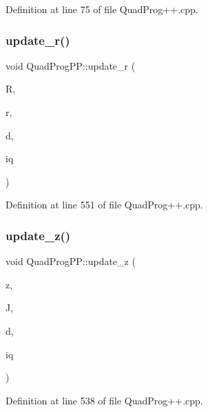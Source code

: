 Definition at line 75 of file Quad\+Prog++.\+cpp.

\hypertarget{namespaceQuadProgPP_a633fa931fb0b0d4cc2ba0dcb00cbf4b7}{}\label{namespaceQuadProgPP_a633fa931fb0b0d4cc2ba0dcb00cbf4b7} 
\subsubsection{\texorpdfstring{update\+\_\+r()}{update\_r()}}
{\footnotesize\ttfamily void Quad\+Prog\+P\+P\+::update\+\_\+r (\begin{DoxyParamCaption}\item[{const Eigen\+::\+Matrix\+Xd \&}]{R,  }\item[{Eigen\+::\+Vector\+Xd \&}]{r,  }\item[{const Eigen\+::\+Vector\+Xd \&}]{d,  }\item[{int}]{iq }\end{DoxyParamCaption})\hspace{0.3cm}{\ttfamily [inline]}}



Definition at line 551 of file Quad\+Prog++.\+cpp.

\hypertarget{namespaceQuadProgPP_ad1f10b211fb5b81828c9a8bb252ba732}{}\label{namespaceQuadProgPP_ad1f10b211fb5b81828c9a8bb252ba732} 
\subsubsection{\texorpdfstring{update\+\_\+z()}{update\_z()}}
{\footnotesize\ttfamily void Quad\+Prog\+P\+P\+::update\+\_\+z (\begin{DoxyParamCaption}\item[{Eigen\+::\+Vector\+Xd \&}]{z,  }\item[{const Eigen\+::\+Matrix\+Xd \&}]{J,  }\item[{const Eigen\+::\+Vector\+Xd \&}]{d,  }\item[{int}]{iq }\end{DoxyParamCaption})\hspace{0.3cm}{\ttfamily [inline]}}



Definition at line 538 of file Quad\+Prog++.\+cpp.

